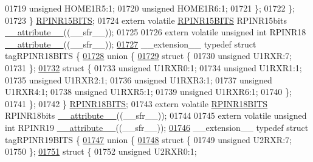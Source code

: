 \begin{DoxyCode}
01719       \textcolor{keywordtype}{unsigned} HOME1R5:1;
01720       \textcolor{keywordtype}{unsigned} HOME1R6:1;
01721     \};
01722   \};
01723 \} \hyperlink{a00014_d8/dcb/a00706}{RPINR15BITS};
01724 \textcolor{keyword}{extern} \textcolor{keyword}{volatile} \hyperlink{a00014_d8/dcb/a00706}{RPINR15BITS} RPINR15bits \hyperlink{a00015_a493c46f03454991ccc5aa7a6e1dfb2a7}{\_\_attribute\_\_}((\_\_sfr\_\_));
01725 
01726 \textcolor{keyword}{extern} \textcolor{keyword}{volatile} \textcolor{keywordtype}{unsigned} \textcolor{keywordtype}{int}  RPINR18 \hyperlink{a00015_a493c46f03454991ccc5aa7a6e1dfb2a7}{\_\_attribute\_\_}((\_\_sfr\_\_));
\hypertarget{a00015_source_l01727}{}\hyperlink{a00014}{01727} \_\_extension\_\_ \textcolor{keyword}{typedef} \textcolor{keyword}{struct }tagRPINR18BITS \{
\hypertarget{a00015_source_l01728}{}\hyperlink{a00015}{01728}   \textcolor{keyword}{union }\{
\hypertarget{a00015_source_l01729}{}\hyperlink{a00015}{01729}     \textcolor{keyword}{struct }\{
01730       \textcolor{keywordtype}{unsigned} U1RXR:7;
01731     \};
\hypertarget{a00015_source_l01732}{}\hyperlink{a00015}{01732}     \textcolor{keyword}{struct }\{
01733       \textcolor{keywordtype}{unsigned} U1RXR0:1;
01734       \textcolor{keywordtype}{unsigned} U1RXR1:1;
01735       \textcolor{keywordtype}{unsigned} U1RXR2:1;
01736       \textcolor{keywordtype}{unsigned} U1RXR3:1;
01737       \textcolor{keywordtype}{unsigned} U1RXR4:1;
01738       \textcolor{keywordtype}{unsigned} U1RXR5:1;
01739       \textcolor{keywordtype}{unsigned} U1RXR6:1;
01740     \};
01741   \};
01742 \} \hyperlink{a00014_d7/d7e/a00709}{RPINR18BITS};
01743 \textcolor{keyword}{extern} \textcolor{keyword}{volatile} \hyperlink{a00014_d7/d7e/a00709}{RPINR18BITS} RPINR18bits \hyperlink{a00015_a493c46f03454991ccc5aa7a6e1dfb2a7}{\_\_attribute\_\_}((\_\_sfr\_\_));
01744 
01745 \textcolor{keyword}{extern} \textcolor{keyword}{volatile} \textcolor{keywordtype}{unsigned} \textcolor{keywordtype}{int}  RPINR19 \hyperlink{a00015_a493c46f03454991ccc5aa7a6e1dfb2a7}{\_\_attribute\_\_}((\_\_sfr\_\_));
\hypertarget{a00015_source_l01746}{}\hyperlink{a00014}{01746} \_\_extension\_\_ \textcolor{keyword}{typedef} \textcolor{keyword}{struct }tagRPINR19BITS \{
\hypertarget{a00015_source_l01747}{}\hyperlink{a00015}{01747}   \textcolor{keyword}{union }\{
\hypertarget{a00015_source_l01748}{}\hyperlink{a00015}{01748}     \textcolor{keyword}{struct }\{
01749       \textcolor{keywordtype}{unsigned} U2RXR:7;
01750     \};
\hypertarget{a00015_source_l01751}{}\hyperlink{a00015}{01751}     \textcolor{keyword}{struct }\{
01752       \textcolor{keywordtype}{unsigned} U2RXR0:1;

\end{DoxyCode}
